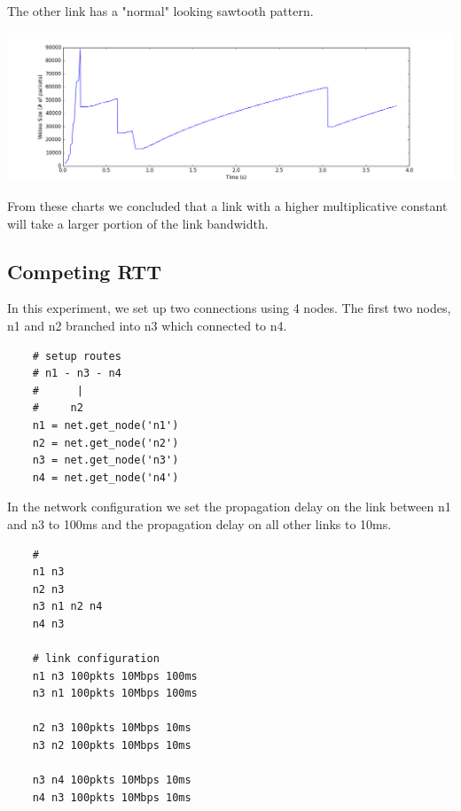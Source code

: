 \documentclass[11pt]{article}
\begin{document}
\vspace{5mm}

The other link has a "normal" looking sawtooth pattern.

\vspace{5mm}

\includegraphics[width=17cm]{charts/advanced/competingAimd/windowSize1.png}

\vspace{5mm}

From these charts we concluded that a link with a higher multiplicative constant will take a larger portion of the link bandwidth.

\subsection{Competing RTT}

In this experiment, we set up two connections using 4 nodes. The first two nodes, n1 and n2 branched into n3 which connected to n4.

\vspace{5mm}

\begin{lstlisting}
    # setup routes
    # n1 - n3 - n4
    #      |
    #     n2
    n1 = net.get_node('n1')
    n2 = net.get_node('n2')
    n3 = net.get_node('n3')
    n4 = net.get_node('n4')
\end{lstlisting}

\vspace{5mm}

In the network configuration we set the propagation delay on the link between n1 and n3 to 100ms and the propagation delay on all other links to 10ms.

\vspace{5mm}

\begin{lstlisting}
    #
    n1 n3
    n2 n3
    n3 n1 n2 n4
    n4 n3

    # link configuration
    n1 n3 100pkts 10Mbps 100ms
    n3 n1 100pkts 10Mbps 100ms

    n2 n3 100pkts 10Mbps 10ms
    n3 n2 100pkts 10Mbps 10ms

    n3 n4 100pkts 10Mbps 10ms
    n4 n3 100pkts 10Mbps 10ms
\end{lstlisting}
\end{document}
